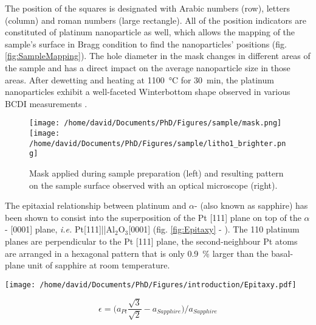 The position of the squares is designated with Arabic numbers (row), letters (column) and roman numbers (large rectangle).
All of the position indicators are constituted of platinum nanoparticle as well, which allows the mapping of the sample's surface in Bragg condition to find the nanoparticles' positions (fig. \ref{fig:SampleMapping}).
The hole diameter in the mask changes in different areas of the sample and has a direct impact on the average nanoparticle size in those areas.
After dewetting and heating at \qty{1100}{\degreeCelsius} for \qty{30}{\minute}, the platinum nanoparticles exhibit a well-faceted Winterbottom shape observed in various BCDI measurements \parencite{Dupraz2017}.

\begin{figure}[!htb]
    \centering
    \texttt{[image: /home/david/Documents/PhD/Figures/sample/mask.png]}
    \texttt{[image: /home/david/Documents/PhD/Figures/sample/litho1\_brighter.png]}
    \caption{
        Mask applied during sample preparation (left) and resulting pattern on the sample surface observed with an optical microscope (right).
    }
    \label{fig:Mask}
\end{figure}

The epitaxial relationship between platinum and $\alpha$- (also known as sapphire) has been shown to consist into the superposition of the Pt [111] plane on top of the $\alpha$- [0001] plane, \textit{i.e.} Pt[111]||Al$_2$O$_3$[0001] (fig. \ref{fig:Epitaxy} - \cite{Farrow1993}).
The {110} platinum planes are perpendicular to the Pt [111] plane, the second-neighbour Pt atoms are arranged in a hexagonal pattern that is only \qty{0.9}{\percent} larger than the basal-plane unit of sapphire at room temperature.

\begin{minipage}{0.55\linewidth}
    \centering
    \texttt{[image: /home/david/Documents/PhD/Figures/introduction/Epitaxy.pdf]}
    \label{fig:Epitaxy}
\end{minipage}%
\hfill%
\begin{minipage}{0.44\linewidth}
    \begin{equation}
        \epsilon = \big( a_{Pt} \frac{\sqrt{3}}{\sqrt{2}} - a_{Sapphire} \big) / a_{Sapphire}
        \label{eq:MisfitStrain}
    \end{equation}
\end{minipage}%


